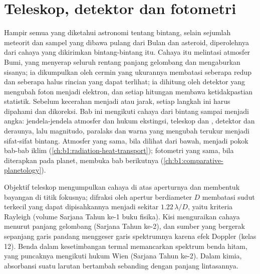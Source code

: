 \chapter{Teleskop, detektor dan fotometri}\label{ch:b1:observing-the-sky}

Hampir semua yang diketahui astronomi tentang bintang, selain sejumlah meteorit dan sampel yang dibawa pulang dari Bulan dan asteroid, diperolehnya dari cahaya yang dikirimkan bintang-bintang itu. Cahaya itu melintasi atmosfer Bumi, yang menyerap seluruh rentang panjang gelombang dan mengaburkan sisanya; ia dikumpulkan oleh cermin yang ukurannya membatasi seberapa redup dan seberapa halus rincian yang dapat terlihat; ia dihitung oleh detektor yang mengubah foton menjadi elektron, dan setiap hitungan membawa ketidakpastian statistik. Sebelum kecerahan menjadi  atau jarak, setiap langkah ini harus dipahami dan dikoreksi. Bab ini mengikuti cahaya dari bintang sampai menjadi angka: jendela-jendela atmosfer dan hukum ekstingsi, teleskop dan , detektor dan deraunya, lalu magnitudo, paralaks dan warna yang mengubah  terukur menjadi sifat-sifat bintang. Atmosfer yang sama, bila dilihat dari bawah, menjadi pokok bab-bab iklim (\cref{ch:b1:radiation-heat-transport}); fotometri yang sama, bila diterapkan pada planet, membuka bab berikutnya (\cref{ch:b1:comparative-planetology}).

\begin{recall}
Objektif teleskop mengumpulkan cahaya di atas aperturnya dan membentuk bayangan di titik fokusnya; difraksi oleh apertur berdiameter $D$ membatasi sudut terkecil yang dapat dipisahkannya menjadi sekitar $1.22\,\lambda/D$, yaitu kriteria Rayleigh (volume Sarjana Tahun ke-1 buku fisika). Kisi menguraikan cahaya menurut panjang gelombang (Sarjana Tahun ke-2), dan sumber yang bergerak sepanjang garis pandang menggeser garis spektrumnya karena efek Doppler (kelas 12). Benda dalam kesetimbangan termal memancarkan spektrum benda hitam, yang puncaknya mengikuti hukum Wien (Sarjana Tahun ke-2). Dalam kimia, absorbansi suatu larutan bertambah sebanding dengan panjang lintasannya.
\end{recall}

